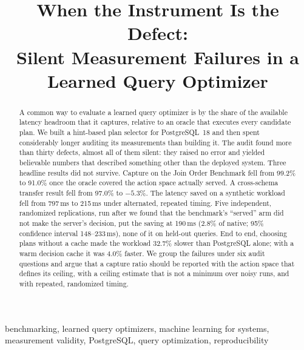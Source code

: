 \documentclass[conference]{IEEEtran}
\begin{document}
\title{When the Instrument Is the Defect:\\
Silent Measurement Failures in a Learned Query Optimizer}

\author{
}

\maketitle

\begin{abstract}
A common way to evaluate a learned query optimizer is by the share of the
available latency headroom that it captures, relative to an oracle that
executes every candidate plan. We built a hint-based plan selector for
PostgreSQL~18 and then spent considerably longer auditing its measurements than
building it. The audit found more than thirty defects, almost all of them
silent: they raised no error and yielded believable numbers that described
something other than the deployed system. Three headline results did not
survive. Capture on the Join Order Benchmark fell from 99.2\% to 91.0\% once the
oracle covered the action space actually served. A cross-schema transfer result
fell from 97.0\% to $-5.3$\%. The latency saved on a synthetic workload fell
from 797\,ms to 215\,ms under alternated, repeated timing. Five independent,
randomized replications, run after we found that the benchmark's ``served''
arm did not make the server's decision, put the saving at 190\,ms (2.8\% of
native; 95\% confidence interval 148--233\,ms), none of it on held-out queries. End
to end, choosing plans without a cache made the workload 32.7\% slower than
PostgreSQL alone; with a warm decision cache it was 4.0\% faster. We group the
failures under six audit questions and argue that a capture ratio should be
reported with
the action space that defines its ceiling, with a ceiling estimate that is not
a minimum over noisy runs, and with repeated, randomized timing.
\end{abstract}

\begin{IEEEkeywords}
benchmarking, learned query optimizers, machine learning for systems,
measurement validity, PostgreSQL, query optimization, reproducibility
\end{IEEEkeywords}

\end{document}
